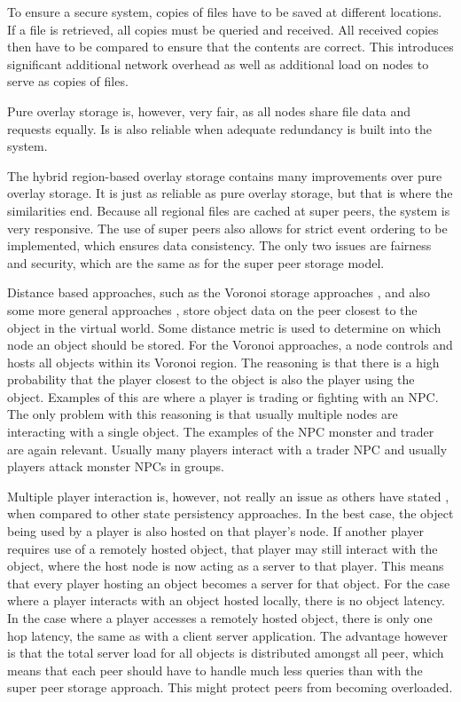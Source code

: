 \documentclass[journal,oneside,a4paper,onecolumn]{IEEEtran}
\begin{document}
To ensure a secure system, copies of files have to be saved at different locations. If a file is retrieved, all copies must be queried and received. All received copies then have to be compared to ensure that the contents are correct. This introduces significant additional network overhead as well as additional load on nodes to serve as copies of files.

Pure overlay storage is, however, very fair, as all nodes share file data and requests equally. Is is also reliable when adequate redundancy is built into the system.

The hybrid region-based overlay storage contains many improvements over pure overlay storage. It is just as reliable as pure overlay storage, but that is where the similarities end. Because all regional files are cached at super peers, the system is very responsive. The use of super peers also allows for strict event ordering to be implemented, which ensures data consistency. The only two issues are fairness and security, which are the same as for the super peer storage model.

Distance based approaches, such as the Voronoi storage approaches \cite{Buyukkaya_voronoi_state_management}, \cite{Hu_voronoi_IM} and also some more general approaches \cite{colyseus_distance_based}, store object data on the peer closest to the object in the virtual world. Some distance metric is used to determine on which node an object should be stored. For the Voronoi approaches, a node controls and hosts all objects within its Voronoi region. The reasoning is that there is a high probability that the player closest to the object is also the player using the object. Examples of this are where a player is trading or fighting with an NPC. The only problem with this reasoning is that usually multiple nodes are interacting with a single object. The examples of the NPC monster and trader are again relevant. Usually many players interact with a trader NPC and usually players attack monster NPCs in groups.

Multiple player interaction is, however, not really an issue as others have stated \cite{}, when compared to other state persistency approaches. In the best case, the object being used by a player is also hosted on that player's node. If another player requires use of a remotely hosted object, that player may still interact with the object, where the host node is now acting as a server to that player. This means that every player hosting an object becomes a server for that object. For the case where a player interacts with an object hosted locally, there is no object latency. In the case where a player accesses a remotely hosted object, there is only one hop latency, the same as with a client server application. The advantage however is that the total server load for all objects is distributed amongst all peer, which means that each peer should have to handle much less queries than with the super peer storage approach. This might protect peers from becoming overloaded.
\end{document}
